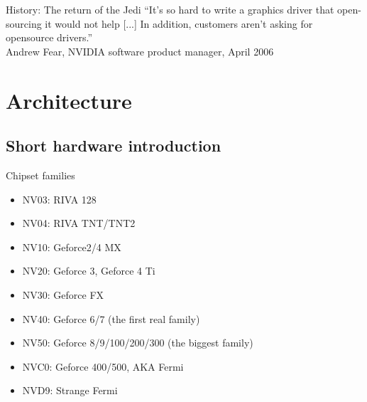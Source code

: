 \documentclass[11pt,english,compress]{beamer}
\begin{document}
	\begin{frame}
		\begin{block}{History: The return of the Jedi}
			``It's so hard to write a graphics driver that open-sourcing it
			would not help [...] In addition, customers aren't asking for opensource drivers.''\\
			Andrew Fear, NVIDIA software product manager, April 2006
		\end{block}
	\end{frame}

\section{Architecture}
	\subsection{Short hardware introduction}
		\begin{frame}
			\begin{block}{Chipset families}
				\begin{itemize}
					\item NV03: RIVA 128
					\item NV04: RIVA TNT/TNT2
					\item NV10: Geforce2/4 MX
					\item NV20: Geforce 3, Geforce 4 Ti
					\item NV30: Geforce FX
					\item NV40: Geforce 6/7 (the first real family) 
					\item NV50: Geforce 8/9/100/200/300 (the biggest family)
					\item NVC0: Geforce 400/500, AKA Fermi
					\item NVD9: Strange Fermi
				\end{itemize}
			\end{block}
		\end{frame}
\end{document}
